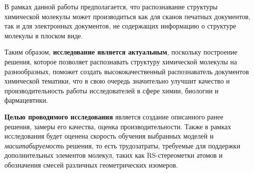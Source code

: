 В рамках данной работы предполагается, что распознавание структуры химической молекулы может производиться как для сканов печатных документов, так и для электронных документов, не содержащих информацию о структуре молекулы в плоском виде.

Таким образом, \textbf{исследование является актуальным}, поскольку построение решения, которое позволяет распознавать структуру химической молекулы на разнообразных, поможет создать высококачественный распознаватель документов химической тематики, что в свою очередь значительно улучшит качество и производительность работы исследователей в сфере химии, биологии и фармацевтики.

\textbf{Целью проводимого исследования} является создание описанного ранее решения, замеры его качества, оценка производительности. Также в рамках исследования будет оценена скорость обучения выбранных моделей и \textit{масштабируемость} решения, то есть трудозатраты, требуемые для поддержки дополнительных элементов молекул, таких как RS-стереометки атомов и обозначения смесей различных геометрических изомеров.




